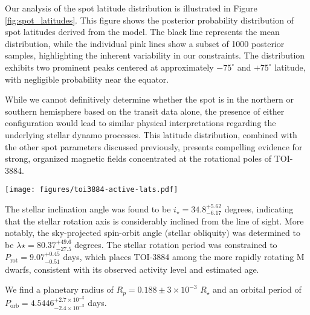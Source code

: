 \documentclass[twocolumn]{aastex631}
\begin{document}
Our analysis of the spot latitude distribution is illustrated in Figure \ref{fig:spot_latitudes}. This figure shows the posterior 
probability distribution of spot latitudes derived from the model. The black line represents the mean distribution, 
while the individual pink lines show a subset of 1000 posterior samples, highlighting the inherent variability in our constraints. 
The distribution exhibits two prominent peaks centered at approximately $-75^{\circ}$ and $+75^{\circ}$ latitude, 
with negligible probability near the equator.

While we cannot definitively determine whether the spot is in the northern or southern hemisphere based on the transit data alone, 
the presence of either configuration would lead to similar physical interpretations regarding the underlying stellar dynamo processes. 
This latitude distribution, combined with the other spot parameters discussed previously, presents compelling evidence for strong, 
organized magnetic fields concentrated at the rotational poles of TOI-3884.
%
\begin{figure*}[hbt!]
    \centering
    \texttt{[image: figures/toi3884-active-lats.pdf]}
    \caption{Posterior probability distribution of spot latitudes for TOI-3884. The black line shows the mean distribution, 
    while the pink lines represent individual posterior samples from our MCMC analysis. The distribution peaks at high latitudes 
    ($\pm75^{\circ}$) with minimal probability near the equator, indicating a strong preference for near-polar spots.
    The symmetry across 
    the equator reflects the inherent degeneracy in determining the hemisphere of spot locations from transit data alone.}
    \label{fig:spot_latitudes}
\end{figure*}
%

The stellar inclination angle was found to be $i_\star = {34.8}^{+5.62}_{-6.17}$ degrees, indicating that the stellar rotation 
axis is considerably inclined from the line of sight. More notably, the sky-projected spin-orbit angle (stellar obliquity) was 
determined to be $\lambda\star = {80.37}^{+49.6}_{-27.5}$ degrees.
The stellar rotation period was constrained to $P_\text{rot} = 9.07^{+0.45}_{-0.51}$ days, which places TOI-3884 among the 
more rapidly rotating M dwarfs, consistent with its observed activity level and estimated age.

We find a planetary radius of $R_p = 0.188 \pm 3\times10^{-3}$ $R_\star$ and an orbital period of 
$P_\text{orb} = 4.5446^{+2.7\times10^{-5}}_{-2.4\times10^{-5}}$ days. 
\end{document}
